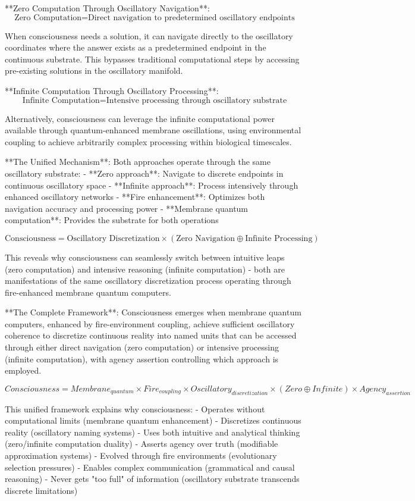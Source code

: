\documentclass[12pt]{article}
\begin{document}
**Zero Computation Through Oscillatory Navigation**: 
$$\text{Zero Computation} = \text{Direct navigation to predetermined oscillatory endpoints}$$

When consciousness needs a solution, it can navigate directly to the oscillatory coordinates where the answer exists as a predetermined endpoint in the continuous substrate. This bypasses traditional computational steps by accessing pre-existing solutions in the oscillatory manifold.

**Infinite Computation Through Oscillatory Processing**:
$$\text{Infinite Computation} = \text{Intensive processing through oscillatory substrate}$$

Alternatively, consciousness can leverage the infinite computational power available through quantum-enhanced membrane oscillations, using environmental coupling to achieve arbitrarily complex processing within biological timescales.

**The Unified Mechanism**: Both approaches operate through the same oscillatory substrate:
- **Zero approach**: Navigate to discrete endpoints in continuous oscillatory space
- **Infinite approach**: Process intensively through enhanced oscillatory networks
- **Fire enhancement**: Optimizes both navigation accuracy and processing power
- **Membrane quantum computation**: Provides the substrate for both operations

$$\text{Consciousness} = \text{Oscillatory Discretization} \times (\text{Zero Navigation} \oplus \text{Infinite Processing})$$

This reveals why consciousness can seamlessly switch between intuitive leaps (zero computation) and intensive reasoning (infinite computation) - both are manifestations of the same oscillatory discretization process operating through fire-enhanced membrane quantum computers.

**The Complete Framework**: Consciousness emerges when membrane quantum computers, enhanced by fire-environment coupling, achieve sufficient oscillatory coherence to discretize continuous reality into named units that can be accessed through either direct navigation (zero computation) or intensive processing (infinite computation), with agency assertion controlling which approach is employed.

$$Consciousness = Membrane_{quantum} \times Fire_{coupling} \times Oscillatory_{discretization} \times (Zero \oplus Infinite) \times Agency_{assertion}$$

This unified framework explains why consciousness:
- Operates without computational limits (membrane quantum enhancement)
- Discretizes continuous reality (oscillatory naming systems)
- Uses both intuitive and analytical thinking (zero/infinite computation duality)
- Asserts agency over truth (modifiable approximation systems)
- Evolved through fire environments (evolutionary selection pressures)
- Enables complex communication (grammatical and causal reasoning)
- Never gets "too full" of information (oscillatory substrate transcends discrete limitations)
\end{document}
